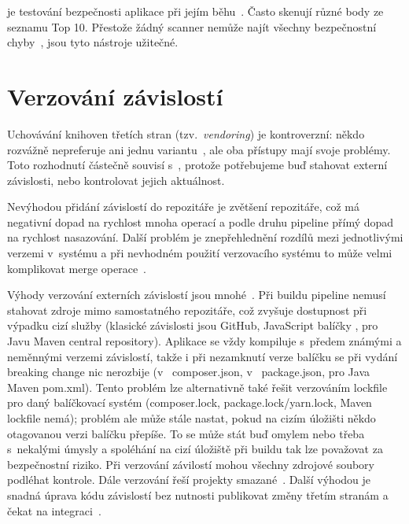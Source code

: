          je testování bezpečnosti aplikace při jejím běhu~\cite{dast}. Často skenují různé body ze seznamu  Top 10. Přestože žádný scanner nemůže najít všechny bezpečnostní chyby~\cite{netsparker-scanner}, jsou tyto nástroje užitečné.

    \section*{Verzování závislostí}
        Uchovávání knihoven třetích stran (tzv.~\textit{vendoring}) je kontroverzní: někdo rozvážně nepreferuje ani jednu variantu~\cite{copes-commit-npm}, ale oba přístupy mají svoje problémy. Toto rozhodnutí částečně souvisí s~\CI, protože potřebujeme buď stahovat externí závislosti, nebo kontrolovat jejich aktuálnost.


        Nevýhodou přidání závislostí do repozitáře je zvětšení repozitáře, což má negativní dopad na rychlost mnoha operací a podle druhu \CICD pipeline přímý dopad na rychlost nasazování. Další problém je znepřehlednění rozdílů mezi jednotlivými verzemi v~systému a při nevhodném použití verzovacího systému to může velmi komplikovat merge operace~\cite{should-i-vendor}.

        Výhody verzování externích závislostí jsou mnohé~\cite{andrawos2017cloud}. Při buildu \CICD pipeline nemusí stahovat zdroje mimo samostatného repozitáře, což zvyšuje dostupnost při výpadku cizí služby (klasické závislosti jsou GitHub, JavaScript balíčky , pro Javu Maven central repository). Aplikace se vždy kompiluje s~předem známými a neměnnými verzemi závislostí, takže i při nezamknutí verze balíčku se při vydání breaking change nic nerozbije (v~ composer.json, v~ package.json, pro Java Maven pom.xml). Tento problém lze alternativně také řešit verzováním lockfile pro daný balíčkovací systém (composer.lock, package.lock/yarn.lock, Maven lockfile nemá); problém ale může stále nastat, pokud na cizím úložišti někdo otagovanou verzi balíčku přepíše. To se může stát buď omylem nebo třeba s~nekalými úmysly a spoléhání na cizí úložiště při buildu tak lze považovat za bezpečnostní riziko. Při verzování závilostí mohou všechny zdrojové soubory podléhat kontrole. Dále verzování řeší projekty smazané~\cite{williams-left-pad}. Další výhodou je snadná úprava kódu závislostí bez nutnosti publikovat změny třetím stranám a čekat na integraci~\cite{rusnavcko2014fedora}.
